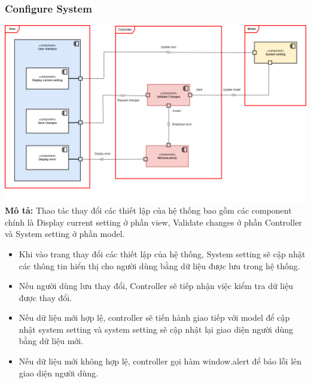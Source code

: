         \subsubsection{Configure System}
        \includegraphics[width=\textwidth]{images/Task3/Component Diagrams/ConfigureSystemComponentDiagram.drawio.png}
        \textbf{Mô tả:}
        Thao tác thay đổi các thiết lập của hệ thống bao gồm các component chính là Display current setting ở phần view, Validate changes ở phần Controller và System setting ở phần model.
        \begin{itemize}
            \item Khi vào trang thay đổi các thiết lập của hệ thống, System setting sẽ cập nhật các thông tin hiển thị cho người dùng bằng dữ liệu được lưu trong hệ thống.
            \item Nếu người dùng lưu thay đổi, Controller sẽ tiếp nhận việc kiểm tra dữ liệu được thay đổi.
            \item Nếu dữ liệu mới hợp lệ, controller sẽ tiến hành giao tiếp với model để cập nhật system setting và system setting sẽ cập nhật lại giao diện người dùng bằng dữ liệu mới.
            \item Nếu dữ liệu mới không hợp lệ, controller gọi hàm window.alert để báo lỗi lên giao diện người dùng.
        \end{itemize}

        \newpage
